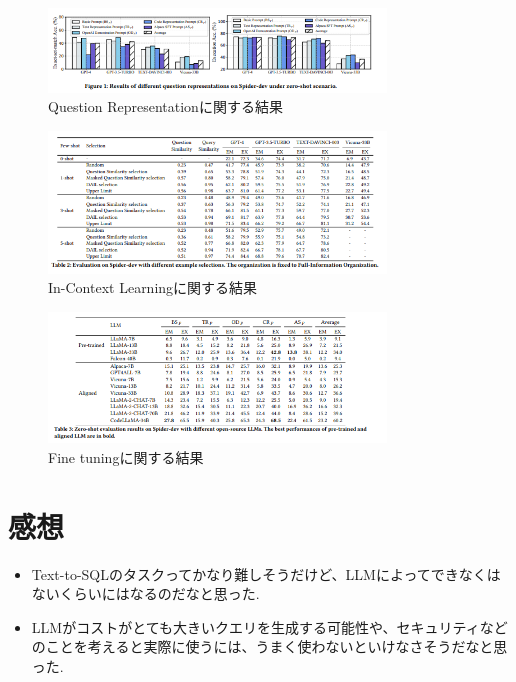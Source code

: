 \documentclass[dvipdfmx,uplatex]{jsarticle}
\theoremstyle{remark}
\newenvironment{kansou}{
    \begin{tcolorbox}[
        colframe=brown,
        colback=brown!10!white,
        colbacktitle=brown!40!white,
        coltitle=black,fonttitle=\bfseries
    ]
}{
    \end{tcolorbox}
}
\begin{document}
\begin{figure}
    \centering
    \includegraphics[width=0.8\textwidth]{img/text2sql-with-llm/question-representation.png}
    \caption{Question Representationに関する結果}
    \label{fig:question-representation}
\end{figure}

\begin{figure}
    \centering
    \includegraphics[width=0.8\textwidth]{img/text2sql-with-llm/icl.png}
    \caption{In-Context Learningに関する結果}
    \label{fig:in-context-learning}
\end{figure}

\begin{figure}
    \centering
    \includegraphics[width=0.8\textwidth]{img/text2sql-with-llm/fine-tuning.png}
    \caption{Fine tuningに関する結果}
    \label{fig:fine-tuning}
\end{figure}

\section{感想}
\begin{kansou}
\begin{itemize}
  \item Text-to-SQLのタスクってかなり難しそうだけど、LLMによってできなくはないくらいにはなるのだなと思った.
  \item LLMがコストがとても大きいクエリを生成する可能性や、セキュリティなどのことを考えると実際に使うには、うまく使わないといけなさそうだなと思った.
\end{itemize}
\end{kansou}



\end{document}
